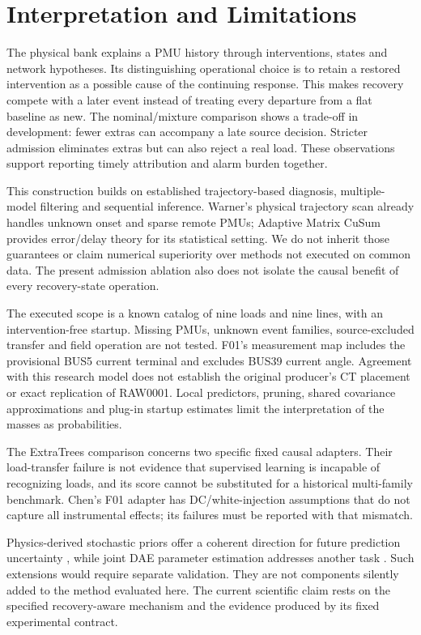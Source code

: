 \section{Interpretation and Limitations}
\label{sec:discussion}

The physical bank explains a PMU history through interventions, states and
network hypotheses. Its distinguishing operational choice is to retain a
restored intervention as a possible cause of the continuing response.
This makes recovery compete with a later event instead of treating every
departure from a flat baseline as new. The nominal/mixture comparison
shows a trade-off in development: fewer extras can accompany a late source
decision. Stricter admission eliminates extras but can also reject a real
load. These observations support reporting timely attribution and alarm
burden together.

This construction builds on established trajectory-based diagnosis,
multiple-model filtering and sequential inference. Warner's physical
trajectory scan already handles unknown onset and sparse remote PMUs;
Adaptive Matrix CuSum provides error/delay theory for its statistical
setting. We do not inherit those guarantees or claim numerical superiority
over methods not executed on common data. The present admission ablation
also does not isolate the causal benefit of every recovery-state operation.

The executed scope is a known catalog of nine loads and nine lines, with
an intervention-free startup. Missing PMUs, unknown event families,
source-excluded transfer and field operation are not tested. F01's
measurement map includes the provisional BUS5 current terminal and excludes
BUS39 current angle. Agreement with this research model does not establish
the original producer's CT placement or exact replication of RAW0001.
Local predictors, pruning, shared covariance approximations and plug-in
startup estimates limit the interpretation of the masses as probabilities.

The ExtraTrees comparison concerns two specific fixed causal adapters.
Their load-transfer failure is not evidence that supervised learning is
incapable of recognizing loads, and its score cannot be substituted for a
historical multi-family benchmark. Chen's F01 adapter has DC/white-injection
assumptions that do not capture all instrumental effects; its failures
must be reported with that mismatch.

Physics-derived stochastic priors offer a coherent direction for future
prediction uncertainty \cite{ensaf2023kernel,tartakovsky2023gp}, while
joint DAE parameter estimation addresses another task \cite{albustami2026dae}.
Such extensions would require separate validation. They are not components
silently added to the method evaluated here. The current scientific claim
rests on the specified recovery-aware mechanism and the evidence produced
by its fixed experimental contract.

